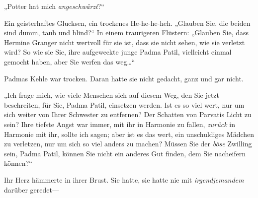 „Potter hat mich \emph{angeschwärzt}?“

Ein geisterhaftes Glucksen, ein trockenes He-he-he-heh. „Glauben Sie, die beiden sind dumm, taub und blind?“ In einem traurigeren Flüstern: „Glauben Sie, dass Hermine Granger nicht wertvoll für sie ist, dass sie nicht sehen, wie sie verletzt wird? So wie sie Sie, ihre aufgeweckte junge Padma Patil, vielleicht einmal gemocht haben, aber Sie werfen das weg…“

Padmas Kehle war trocken. Daran hatte sie nicht gedacht, ganz und gar nicht.

„Ich frage mich, wie viele Menschen sich auf diesem Weg, den Sie jetzt beschreiten, für Sie, Padma Patil, einsetzen werden. Ist es so viel wert, nur um sich weiter von Ihrer Schwester zu entfernen? Der Schatten von Parvatis Licht zu sein? Ihre tiefste Angst war immer, mit ihr in Harmonie zu fallen, \emph{zurück} in Harmonie mit ihr, sollte ich sagen; aber ist es das wert, ein unschuldiges Mädchen zu verletzen, nur um sich so viel anders zu machen? Müssen Sie der \emph{böse} Zwilling sein, Padma Patil, können Sie nicht ein anderes Gut finden, dem Sie nacheifern können?“

Ihr Herz hämmerte in ihrer Brust. Sie hatte, sie hatte nie mit \emph{irgendjemandem} darüber geredet—

